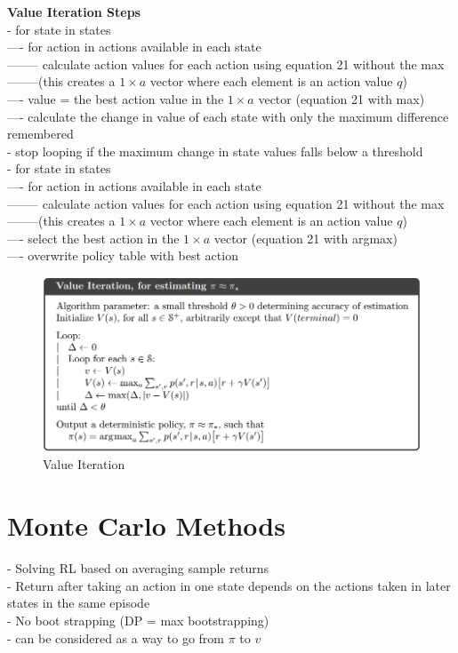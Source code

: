 \documentclass{article}
\begin{document}
\noindent
\textbf{Value Iteration Steps}\\
- for state in states \\
---- for action in actions available in each state \\
-------- calculate action values for each action using equation 21 without the
max\\
--------(this creates a $1 \times a$ vector where each element is an
action value $q$)\\
---- value = the best action value in the $ 1 \times a$ vector (equation 21 with
max)\\
---- calculate the change in value of each state with only the maximum
difference remembered\\
- stop looping if the maximum change in state values falls below a threshold\\
- for state in states\\
---- for action in actions available in each state \\
-------- calculate action values for each action using equation 21 without the
max\\
--------(this creates a $1 \times a$ vector where each element is an
action value $q$)\\
---- select the best action in the $ 1 \times a$ vector (equation 21 with
argmax)\\
---- overwrite policy table with best action

\begin{figure}[h]
\includegraphics[scale=0.35]{value_iteration}
\centering
\caption{Value Iteration}
\end{figure}

\newpage
\noindent
\section{Monte Carlo Methods}
- Solving RL based on averaging sample returns\\
- Return after taking an action in one state depends on the actions taken in
later states in the same episode\\
- No boot strapping (DP = max bootstrapping)\\
- can be considered as a way to go from $\pi$ to $v$\\
\end{document}
